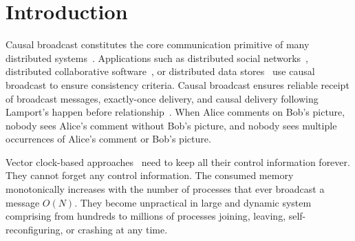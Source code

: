  
\section{Introduction}


Causal broadcast constitutes the core communication primitive of many
distributed systems~\cite{hadzilacos1994modular}. Applications such as
distributed social networks~\cite{borthakur2013petabyte}, distributed
collaborative software~\cite{heinrich2012exploiting,nedelec2016crate}, or
distributed data
stores~\cite{bailis2013bolton,bravo2017saturn,demers1987epidemic,lloyd2011cops,shapiro2011comprehensive}
use causal broadcast to ensure consistency criteria.  Causal broadcast ensures
reliable receipt of broadcast messages, exactly-once delivery, and causal
delivery following Lamport's happen before
relationship~\cite{lamport1978time}. When Alice comments on Bob's picture,
nobody sees Alice's comment without Bob's picture, and nobody sees multiple
occurrences of Alice's comment or Bob's picture.


Vector clock-based
approaches~\cite{malkhi2007concise,mukund2014optimized,nedelec2018pcbroadcast}
need to keep all their control information forever. They cannot forget any
control information.  The consumed memory monotonically increases with the
number of processes that ever broadcast a message $O(N)$.  They become
unpractical in large and dynamic system comprising from hundreds to millions of
processes joining, leaving, self-reconfiguring, or crashing at any time.






